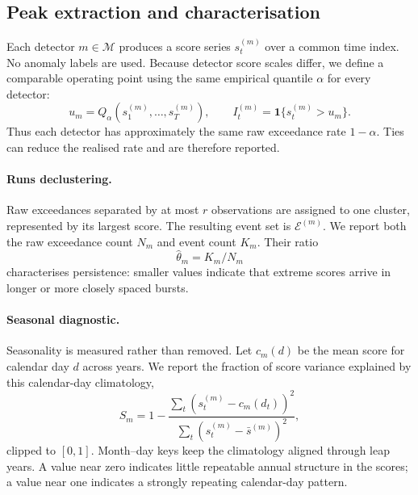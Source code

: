 
\subsection{Peak extraction and characterisation}
\label{subsec:peak-extraction}

Each detector $m \in \mathcal{M}$ produces a score series $s^{(m)}_t$ over a
common time index. No anomaly labels are used. Because detector score scales
differ, we define a comparable operating point using the same empirical
quantile $\alpha$ for every detector:
\begin{equation}
  u_m = Q_{\alpha}\!\left(s^{(m)}_1,\ldots,s^{(m)}_T\right),
  \qquad I^{(m)}_t = \mathbf{1}\{s^{(m)}_t > u_m\}.
  \label{eq:global-percentile}
\end{equation}
Thus each detector has approximately the same raw exceedance rate
$1-\alpha$. Ties can reduce the realised rate and are therefore reported.

\paragraph{Runs declustering.}
Raw exceedances separated by at most $r$ observations are assigned to one
cluster, represented by its largest score. The resulting event set is
$\mathcal{E}^{(m)}$. We report both the raw exceedance count $N_m$ and event
count $K_m$. Their ratio
\begin{equation}
  \hat{\theta}_m = K_m/N_m
  \label{eq:extremal-index}
\end{equation}
characterises persistence: smaller values indicate that extreme scores arrive
in longer or more closely spaced bursts.

\paragraph{Seasonal diagnostic.}
Seasonality is measured rather than removed. Let $c_m(d)$ be the mean score for
calendar day $d$ across years. We report the fraction of score variance
explained by this calendar-day climatology,
\begin{equation}
  S_m = 1 -
  \frac{\sum_t (s^{(m)}_t-c_m(d_t))^2}
       {\sum_t (s^{(m)}_t-\bar{s}^{(m)})^2},
  \label{eq:seasonal-strength}
\end{equation}
clipped to $[0,1]$. Month--day keys keep the climatology aligned through leap
years. A value near zero indicates little repeatable annual structure in the
scores; a value near one indicates a strongly repeating calendar-day pattern.

